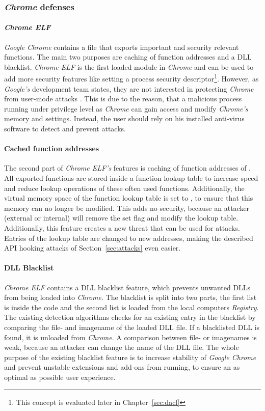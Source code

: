 \subsubsection{\emph{Chrome} defenses}
\paragraph{\emph{Chrome ELF}}
\emph{Google Chrome} contains a  file that exports important and security relevant functions. The main two purposes are caching of function addresses and a \gls{DLL} blacklist. \emph{Chrome ELF} is the first loaded module in \emph{Chrome} and can be used to add more security features like setting a process security descriptor\footnote{This concept is evaluated later in Chapter~\ref{sec:dacl}}. However, as \emph{Google's} development team states, they are not interested in protecting \emph{Chrome} from user-mode attacks \cite{chromium_security}. This is due to the reason, that a malicious process running under privilege level as \emph{Chrome} can gain access and modify \emph{Chrome's} memory and settings. Instead, the user should rely on his installed anti-virus software to detect and prevent attacks.

\paragraph{Cached function addresses}
The second part of \emph{Chrome ELF's} features is caching of function addresses of . All exported functions are stored inside a function lookup table to increase speed and reduce lookup operations of these often used functions. Additionally, the virtual memory space of the function lookup table is set to , to ensure that this memory can no longer be modified. This adds no security, because an attacker (external or internal) will remove the set  flag and modify the lookup table. Additionally, this feature creates a new threat that can be used for attacks. Entries of the lookup table are changed to new addresses, making the described \gls{API} hooking attacks of Section~\ref{sec:attacks} even easier.

\paragraph{DLL Blacklist}
\emph{Chrome ELF} contains a \gls{DLL} blacklist feature, which prevents unwanted \glspl{DLL} from being loaded into \emph{Chrome}. The blacklist is split into two parts, the first list is inside the code and the second list is loaded from the local computers \emph{Registry}. The existing detection algorithms checks for an existing entry in the blacklist by comparing the file- and imagename of the loaded \gls{DLL} file. If a blacklisted \gls{DLL} is found, it is unloaded from \emph{Chrome}. A comparison between file- or imagenames is weak, because an attacker can change the name of the \gls{DLL} file. The whole purpose of the existing blacklist feature is to increase stability of \emph{Google Chrome} and prevent unstable extensions and add-ons from running, to ensure an as optimal as possible user experience.